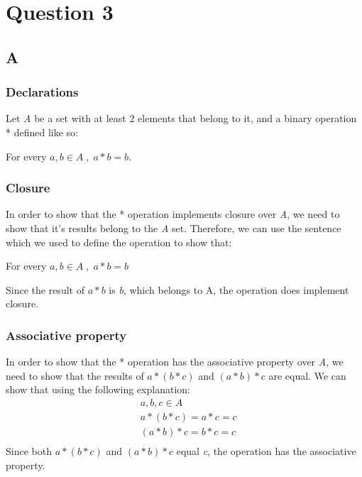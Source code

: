 \documentclass[12pt, oneside]{article}
\begin{document}
\section{Question 3}
\subsection{A}
\setcounter{subsubsection}{-1}
\subsubsection{Declarations}
Let \emph{A} be a set with at least 2 elements that belong to it, and a binary operation * defined like so:
\begin{center}
For every $a, b \in A\;,\;a * b = b$.
\end{center}

\subsubsection{Closure}
In order to show that the * operation implements closure over \emph{A}, we need to show that it's results belong to the \emph{A} set. Therefore, we can use the sentence which we used to define the operation to show that:
\begin{center}
For every $a, b \in A\;,\;a * b = b$
\end{center}
Since the result of $a * b$ is \emph{b}, which belongs to A, the operation does implement closure.

\subsubsection{Associative property}
In order to show that the * operation has the associative property over \emph{A}, we need to show that the results of $a * (b * c)$ and $(a * b) * c$ are equal. We can show that using the following explanation:
\begin{equation*}
\begin{split}
& a, b, c \in A\\
& a * (b * c) = a * c = c\\
& (a * b) * c = b * c = c\\
\end{split}
\end{equation*}
Since both $a * (b * c)$ and $(a * b) * c$ equal \emph{c}, the operation has the associative property.
\clearpage
\end{document}
